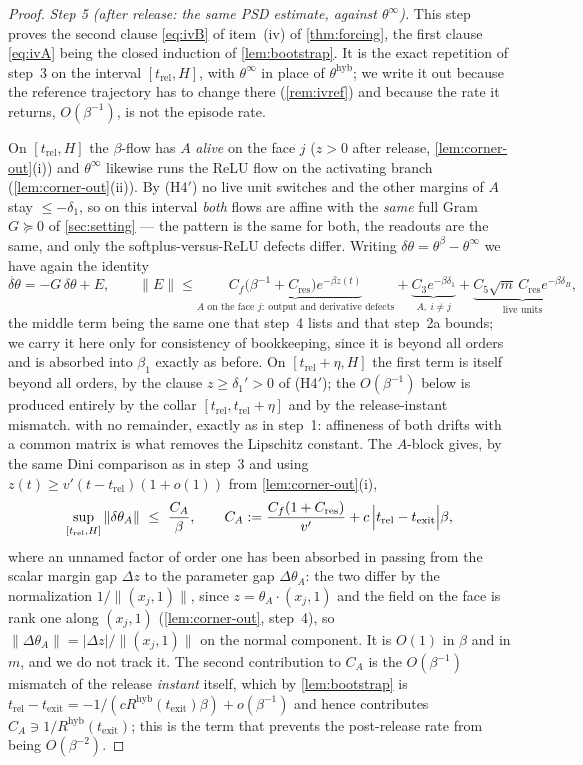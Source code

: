 \documentclass[11pt]{article}
\theoremstyle{definition}
\theoremstyle{remark}
\newcommand{\hyb}{\mathrm{hyb}}
\newcommand{\texit}{t_{\mathrm{exit}}}
\newcommand{\trel}{t_{\mathrm{rel}}}
\begin{document}
\begin{proof}
\emph{Step 5 (after release: the same PSD estimate, against $\theta^\infty$).}
This step proves the second clause \eqref{eq:ivB} of item~(iv) of
\cref{thm:forcing}, the first clause \eqref{eq:ivA} being the closed induction of
\cref{lem:bootstrap}. It is the exact repetition of step~3 on the interval
$[\trel,H]$, with $\theta^\infty$ in place of $\theta^{\hyb}$; we write it out
because the reference trajectory has to change there (\cref{rem:ivref}) and
because the rate it returns, $O(\beta^{-1})$, is not the episode rate.

On $[\trel,H]$ the $\beta$-flow has $A$ \emph{alive} on the face $j$ ($z>0$ after
release, \cref{lem:corner-out}(i)) and $\theta^\infty$ likewise runs the ReLU flow
on the activating branch (\cref{lem:corner-out}(ii)). By (H4$'$) no live unit
switches and the other margins of $A$ stay $\le-\delta_1$, so on this interval
\emph{both} flows are affine with the \emph{same} full Gram $G\succeq0$ of
\cref{sec:setting} --- the pattern is the same for both, the readouts are the
same, and only the softplus-versus-ReLU defects differ. Writing
$\delta\theta=\theta^\beta-\theta^\infty$ we have again the identity
\[
\dot{\delta\theta}=-G\,\delta\theta+E,\qquad
\|E\|\le \underbrace{C_f\bigl(\beta^{-1}+C_{\mathrm{res}}\bigr)e^{-\beta z(t)}}_{A\text{ on the face }j:\ \text{output and derivative defects}}
+\underbrace{C_3e^{-\beta\delta_1}}_{A,\ i\ne j}
+\underbrace{C_5\sqrt m\,C_{\mathrm{res}}e^{-\beta\delta_B}}_{\text{live units}} ,
\]
the middle term being the same one that step~4 lists and that step~2a bounds; we
carry it here only for consistency of bookkeeping, since it is beyond all orders
and is absorbed into $\beta_1$ exactly as before. On $[\trel+\eta,H]$ the first
term is itself beyond all orders, by the clause $z\ge\delta_1'>0$ of (H4$'$); the
$O(\beta^{-1})$ below is produced entirely by the collar $[\trel,\trel+\eta]$ and
by the release-instant mismatch.
with no remainder, exactly as in step~1: affineness of both drifts with a common
matrix is what removes the Lipschitz constant. The $A$-block gives, by the same
Dini comparison as in step~3 and using $z(t)\ge v'(t-\trel)(1+o(1))$ from
\cref{lem:corner-out}(i),
\begin{equation}\label{eq:postrelA}
\sup_{[\trel,H]}\|\delta\theta_A\|\ \le\ \frac{C_A}{\beta},
\qquad
C_A:=\frac{C_f(1+C_{\mathrm{res}})}{v'}+c\,\Bigl|\trel-\texit\Bigr|\beta ,
\end{equation}
where an unnamed factor of order one has been absorbed in passing from the scalar
margin gap $\Delta z$ to the parameter gap $\Delta\theta_A$: the two differ by the
normalization $1/\|(x_j,1)\|$, since $z=\theta_A\cdot(x_j,1)$ and the field on the
face is rank one along $(x_j,1)$ (\cref{lem:corner-out}, step~4), so
$\|\Delta\theta_A\|=|\Delta z|/\|(x_j,1)\|$ on the normal component. It is $O(1)$
in $\beta$ and in $m$, and we do not track it. The second contribution to $C_A$
is the $O(\beta^{-1})$ mismatch of the release \emph{instant} itself, which by
\cref{lem:bootstrap} is
$\trel-\texit=-1/(c R^{\hyb}(\texit)\beta)+o(\beta^{-1})$ and hence contributes
$C_A\ni 1/R^{\hyb}(\texit)$; this is the term that prevents the post-release rate
from being $O(\beta^{-2})$.


\end{proof}
\end{document}
